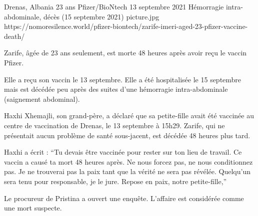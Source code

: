 {Drenas, Albania}
{23 ans}
{Pfizer/BioNtech}
{13 septembre 2021}
{Hémorragie intra-abdominale, décès (15 septembre 2021)}
{picture.jpg}
{https://nomoresilence.world/pfizer-biontech/zarife-imeri-aged-23-pfizer-vaccine-death/}
{

Zarife, âgée de 23 ans seulement, est morte 48 heures après avoir reçu le vaccin
Pfizer.

Elle a reçu son vaccin le 13 septembre. Elle a été hospitalisée le 15 septembre
mais est décédée peu après des suites d'une hémorragie intra-abdominale
(saignement abdominal).

Haxhi Xhemajli, son grand-père, a déclaré que sa petite-fille avait été vaccinée
au centre de vaccination de Drenas, le 13 septembre à 15h29. Zarife, qui ne
présentait aucun problème de santé sous-jacent, est décédée 48 heures plus tard.

Haxhi a écrit : “Tu devais être vaccinée pour rester sur ton lieu de travail. Ce
vaccin a causé ta mort 48 heures après. Ne nous forcez pas, ne nous conditionnez
pas. Je ne trouverai pas la paix tant que la vérité ne sera pas
révélée. Quelqu'un sera tenu pour responsable, je le jure. Repose en paix, notre
petite-fille,”

Le procureur de Pristina a ouvert une enquête. L'affaire est considérée comme
une mort suspecte.

}

